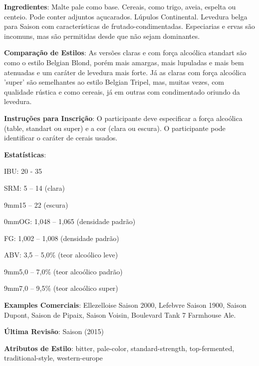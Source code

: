 \textbf{Ingredientes}: Malte pale como base. Cereais, como trigo, aveia, espelta ou centeio. Pode conter adjuntos açucarados. Lúpulos Continental. Levedura belga para Saison com características de frutado-condimentadas. Especiarias e ervas são incomuns, mas são permitidas desde que não sejam dominantes.

\textbf{Comparação de Estilos}: As versões claras e com força alcoólica standart são como o estilo Belgian Blond, porém mais amargas, mais lupuladas e mais bem atenuadas e um caráter de levedura mais forte. Já as claras com força alcoólica 'super' são semelhantes ao estilo Belgian Tripel, mas, muitas vezes, com qualidade rústica e como cereais, já em outras com condimentado oriundo da levedura.

\textbf{Instruções para Inscrição}: O participante deve especificar a força alcoólica (table, standart ou super) e a cor (clara ou escura). O participante pode identificar o caráter de cerais usados.

\textbf{Estatísticas}:

IBU: 20 - 35

SRM: 5 – 14 (clara)

\leftskip9mm15 – 22 (escura)

\leftskip0mmOG: 1,048 – 1,065 (densidade padrão)

FG: 1,002 – 1,008 (densidade padrão)

ABV: 3,5 – 5,0\% (teor alcoólico leve)

\leftskip9mm5,0 – 7,0\% (teor alcoólico padrão)

\leftskip9mm7,0 – 9,5\% (teor alcoólico super)

\textbf{Examples Comerciais}: Ellezelloise Saison 2000, Lefebvre Saison 1900, Saison Dupont, Saison de Pipaix, Saison Voisin, Boulevard Tank 7 Farmhouse Ale.

\textbf{Última Revisão}: Saison (2015)

\textbf{Atributos de Estilo}: bitter, pale-color, standard-strength, top-fermented, traditional-style, western-europe
